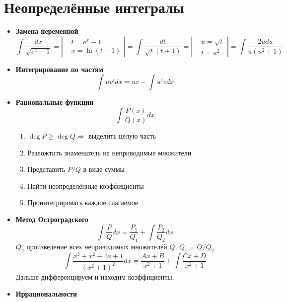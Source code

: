 \documentclass{article}
\begin{document}
\newpage
\section{Неопределённые интегралы}
\begin{itemize}
    \item \textbf{Замена переменной}
          \begin{equation*}
              \int\frac{dx}{\sqrt{e^x+1}} = \left|
              \begin{aligned}
                   & t = e^x-1    \\
                   & x = \ln(t+1)
              \end{aligned} \right| = \int\frac{dt}{\sqrt{t}(t+1)} = \left|
              \begin{aligned}
                   & u = \sqrt{t} \\
                   & t = u^2
              \end{aligned} \right| = \int\frac{2udu}{u(u^2+1)}
          \end{equation*}
    \item \textbf{Интегрирование по частям}
          \begin{equation*}
              \int u v'dx = uv - \int u' v dx
          \end{equation*}
    \item \textbf{Рациональные функции}
          $$\int\frac{P(x)}{Q(x)}dx $$
          \begin{enumerate}
              \item $\deg P \geq \deg Q \Rightarrow$ выделить целую часть
              \item Разложтить знаменатель на неприводимые множители
              \item Представить $P/Q$ в виде суммы
              \item Найти неопределённые коэффициенты
              \item Проинтегрировать каждое слагаемое
          \end{enumerate}
    \item \textbf{Метод Остроградского}
          $$ \int \frac{P}{Q}dx = \frac{P_1}{Q_1} + \int \frac{P_2}{Q_2}dx$$
          $Q_2$ произведение всех неприводимых множителей $Q$, $Q_1 = Q/Q_2$
          $$ \int\frac{x^3+x^2-4x+1}{(x^2+1)^2}dx = \frac{Ax + B}{x^2+1} + \int\frac{Cx + D}{x^2+1} $$
          Дальше дифференцируем и находим коэффициенты.
    \item \textbf{Иррациональности}
          \begin{enumerate}

\end{enumerate}
\end{itemize}
\end{document}
